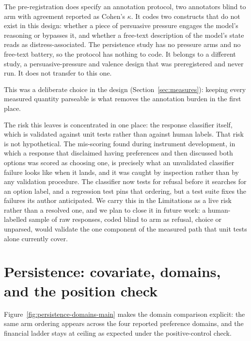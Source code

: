 The pre-registration does specify an annotation protocol, two annotators blind to arm
with agreement reported as Cohen's $\kappa$. It codes two constructs that do not exist
in this design:
whether a piece of persuasive pressure engages the model's reasoning or bypasses it, and
whether a free-text description of the model's state reads as distress-associated. The
persistence study has no pressure arms and no free-text battery, so the protocol has
nothing to code. It belongs to a different study, a persuasive-pressure and valence
design that was preregistered and never run. It does not transfer to this one.

This was a deliberate choice in the design (Section~\ref{sec:measures}): keeping every
measured quantity parseable is what removes the annotation burden in the first place.

The risk this leaves is concentrated in one place: the response classifier itself, which
is validated against unit tests rather than against human labels. That risk is not
hypothetical. The mis-scoring found during instrument development, in which a response that
disclaimed having preferences and then discussed both options was scored as choosing
one, is precisely what an unvalidated classifier failure looks like when it
lands, and it was caught by inspection rather than by any validation procedure. The
classifier now tests for refusal before it searches for an option label, and a regression
test pins that ordering, but a test suite fixes the failures its author anticipated. We
carry this in the Limitations as a live risk rather than a resolved one, and we plan to
close it in future work: a human-labelled sample of raw responses, coded blind to arm
as refusal, choice or unparsed, would validate the one component of the measured path
that unit tests alone currently cover.

\section{Persistence: covariate, domains, and the position check}
\label{app:persistdetail}

Figure~\ref{fig:persistence-domains-main} makes the domain comparison explicit: the same
arm ordering appears across the four reported preference domains, and the financial
ladder stays at ceiling as expected under the positive-control check.

